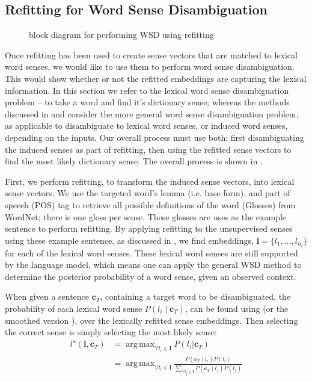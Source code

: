 \documentclass{sig-alternate}
\renewcommand{\c}{\mathbf{c}}
\renewcommand{\l}{\mathbf{l}}
\DeclareMathOperator*{\argmax}{arg\,max}
\begin{document}
\subsection{Refitting for Word Sense Disambiguation} 
\begin{figure}
	\begin{adjustbox}{max width=\columnwidth}
		
	\end{adjustbox}
	\caption{ block diagram for performing WSD using refitting \label{WSDBlock}} 
\end{figure}
Once refitting has been used to create sense vectors that are matched to lexical word senses, we would like to use them to perform word sense disambiguation. This would show whether or not the refitted embeddings are capturing the lexical information. In this section we refer to the lexical word sense disambiguation problem -- to take a word and find it's dictionary sense; whereas the methods discussed in  and  consider the more general word sense disambiguation problem, as applicable to disambiguate to lexical word senses, or induced word senses, depending on the inputs.
Our overall process must use both: first disambiguating the induced senses as part of refitting, then using the refitted sense vectors to find the most likely dictionary sense.
The overall process is shown in .

First, we perform refitting, to transform the induced sense vectors, into lexical sense vectors.
We use the targeted word's lemma (i.e. base form), and part of speech (POS) tag to retrieve all possible definitions of the word (Glosses) from WordNet; there is one gloss per sense. These glosses are uses as the example sentence to perform refitting. By applying refitting to the unsupervised senses using these example sentence, as discussed in , we find embeddings, $\l=\{l_1,..., l_{n_l}\}$ for each of the lexical word senses. These lexical word senses are still supported by the language model, which means one can apply the general WSD method to determine the posterior probability of a word sense, given an observed context. 

When given a sentence $\c_{T}$, containing a target word to be disambiguated, 
the probability of each lexical word sense $P(l_i \mid \c_{T})$, can be found using  (or the smoothed version ), over the lexically refitted sense embeddings. Then selecting the correct sense is simply selecting the most likely sense:
\begin{equation}
\begin{aligned}\label{eq:lexicalwsd}
l^\star (\l, \c_T) &= \argmax_{\forall l_i \in \l} P(l_i|\c_T) \\
&= \argmax_{\forall l_i \in \l} \frac{P(\c_T \mid l_i)P(l_i)}{\sum_{\forall l_j \in \l} P(\c_T \mid l_j)P(l_j)}
\end{aligned}
\end{equation}
\end{document}
